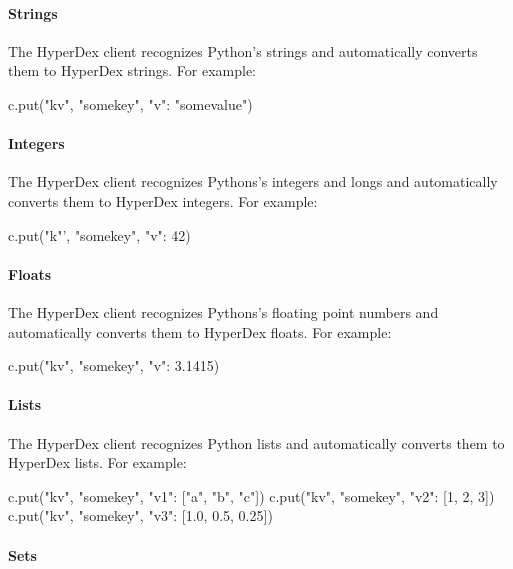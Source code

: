 \paragraph{Strings}

The HyperDex client recognizes Python's strings and automatically converts them
to HyperDex strings.  For example:

\begin{pythoncode}
c.put("kv", "somekey", {"v": "somevalue"})
\end{pythoncode}

\paragraph{Integers}

The HyperDex client recognizes Pythons's integers and longs and automatically
converts them to HyperDex integers.  For example:

\begin{pythoncode}
c.put("k"', "somekey", {"v": 42})
\end{pythoncode}

\paragraph{Floats}

The HyperDex client recognizes Pythons's floating point numbers and
automatically converts them to HyperDex floats.  For example:

\begin{pythoncode}
c.put("kv", "somekey", {"v": 3.1415})
\end{pythoncode}

\paragraph{Lists}

The HyperDex client recognizes Python lists and automatically converts them to
HyperDex lists.  For example:

\begin{pythoncode}
c.put("kv", "somekey", {"v1": ["a", "b", "c"]})
c.put("kv", "somekey", {"v2": [1, 2, 3]})
c.put("kv", "somekey", {"v3": [1.0, 0.5, 0.25]})
\end{pythoncode}

\paragraph{Sets}

